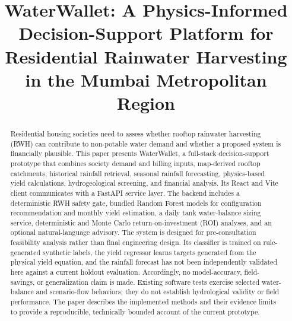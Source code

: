 \documentclass[conference]{IEEEtran}
\begin{document}
\title{WaterWallet: A Physics-Informed Decision-Support Platform for\\
Residential Rainwater Harvesting in the Mumbai Metropolitan Region}

\author{
}

\maketitle

\begin{abstract}
Residential housing societies need to assess whether rooftop rainwater harvesting (RWH) can contribute to non-potable water demand and whether a proposed system is financially plausible. This paper presents WaterWallet, a full-stack decision-support prototype that combines society demand and billing inputs, map-derived rooftop catchments, historical rainfall retrieval, seasonal rainfall forecasting, physics-based yield calculations, hydrogeological screening, and financial analysis. Its React and Vite client communicates with a FastAPI service layer. The backend includes a deterministic RWH safety gate, bundled Random Forest models for configuration recommendation and monthly yield estimation, a daily tank water-balance sizing service, deterministic and Monte Carlo return-on-investment (ROI) analyses, and an optional natural-language advisory. The system is designed for pre-consultation feasibility analysis rather than final engineering design. Its classifier is trained on rule-generated synthetic labels, the yield regressor learns targets generated from the physical yield equation, and the rainfall forecast has not been independently validated here against a current holdout evaluation. Accordingly, no model-accuracy, field-savings, or generalization claim is made. Existing software tests exercise selected water-balance and scenario-flow behaviors; they do not establish hydrological validity or field performance. The paper describes the implemented methods and their evidence limits to provide a reproducible, technically bounded account of the current prototype.
\end{abstract}
\end{document}
